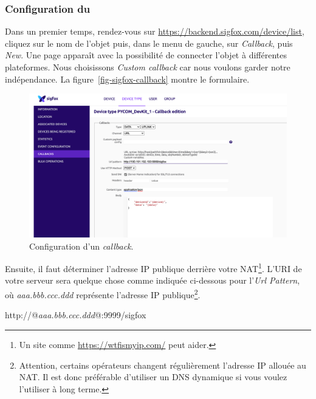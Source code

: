 \subsubsection{Configuration du \textit{}}

Dans un premier temps, rendez-vous sur \url{https://backend.sigfox.com/device/list}, cliquez sur le nom de l’objet puis, dans le menu de gauche, sur \textit{Callback}, puis \textit{New}. Une page apparaît avec la possibilité de connecter l’objet à différentes plateformes. Nous choisissons \textit{Custom callback} car nous voulons garder notre indépendance.
La figure~\vref{fig-sigfox-callback} montre le formulaire.

\begin{figure}[tbp]
\centerline{\includegraphics[width=1\columnwidth]{Pictures/sigfox-callback.png} }
\caption{Configuration d'un \textit{callback}.}
\label{fig-sigfox-callback}
\end{figure}

Ensuite, il faut déterminer l’adresse IP publique derrière votre \ac{NAT}\footnote{Un site comme \url{https://wtfismyip.com/} peut aider.}. L’URI de votre serveur sera quelque chose comme indiquée ci-dessous pour l'\textit{Url Pattern}, où \textit{aaa.bbb.ccc.ddd} représente l'adresse IP publique\footnote{Attention, certains opérateurs changent régulièrement l’adresse IP allouée au NAT. Il est donc préférable d’utiliser un DNS dynamique si vous voulez l’utiliser à long terme.}. 

\begin{termc}[backgroundcolor=\color{blue!10}, basicstyle=\ttfamily\small, escapechar=@]
http://@\textit{aaa.bbb.ccc.ddd}@:9999/sigfox
\end{termc}


     \vspace{1em}

